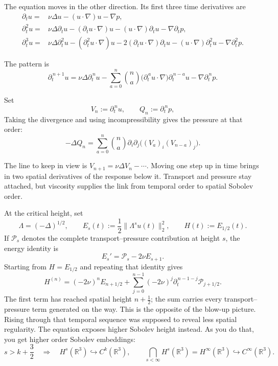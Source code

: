 The equation moves in the other direction. Its first three time derivatives
are
\[
\begin{aligned}
\partial_tu
={}&\nu\Delta u
 -(u\!\cdot\nabla)u
 -\nabla p,\\[3pt]
\partial_t^2u
={}&\nu\Delta\partial_tu
 -(\partial_tu\!\cdot\nabla)u
 -(u\!\cdot\nabla)\partial_tu
 -\nabla\partial_tp,\\[3pt]
\partial_t^3u
={}&\nu\Delta\partial_t^2u
 -(\partial_t^2u\!\cdot\nabla)u
 -2(\partial_tu\!\cdot\nabla)\partial_tu
 -(u\!\cdot\nabla)\partial_t^2u
 -\nabla\partial_t^2p.
\end{aligned}
\]
\begin{samepage}
The pattern is
\[
\partial_t^{\,n+1}u
=\nu\Delta\partial_t^{\,n}u
-\sum_{a=0}^{n}\binom na
  \bigl(\partial_t^{\,a}u\!\cdot\nabla\bigr)
  \partial_t^{\,n-a}u
-\nabla\partial_t^{\,n}p.
\]
\end{samepage}
\begin{samepage}
Set
\[
V_n:=\partial_t^{\,n}u,
\qquad
Q_n:=\partial_t^{\,n}p,
\]
Taking the divergence and using incompressibility gives the pressure at that
order:
\[
-\Delta Q_n
=\sum_{a=0}^{n}\binom na
  \partial_i\partial_j
  \bigl((V_a)_i(V_{n-a})_j\bigr).
\]
\end{samepage}
The line to keep in view is \(V_{n+1}=\nu\Delta V_n-\cdots\). Moving one step
up in time brings in two spatial derivatives of the response below it.
Transport and pressure stay attached, but viscosity supplies the link from
temporal order to spatial Sobolev order.

At the critical height, set
\[
\Lambda=(-\Delta)^{1/2},
\qquad
E_s(t):=\frac12\|\Lambda^su(t)\|_2^2,
\qquad
H(t):=E_{1/2}(t).
\]
If \(\mathcal P_s\) denotes the complete transport--pressure contribution at
height \(s\), the energy identity is
\[
E_s'=\mathcal P_s-2\nu E_{s+1}.
\]
Starting from \(H=E_{1/2}\) and repeating that identity gives
\[
H^{(n)}
=(-2\nu)^nE_{n+1/2}
 +\sum_{j=0}^{n-1}(-2\nu)^j
   \partial_t^{\,n-1-j}\mathcal P_{j+1/2}.
\]
The first term has reached spatial height \(n+\tfrac12\); the sum carries every
transport--pressure term generated on the way. This is the opposite of the
blow-up picture. Rising through that temporal sequence was supposed to reveal
less spatial regularity. The equation exposes higher Sobolev height instead. As
you do that, you get higher order Sobolev embeddings:
\[
s>k+\frac32
\quad\Longrightarrow\quad
H^s(\mathbb R^3)\hookrightarrow C^k(\mathbb R^3),
\qquad
\bigcap_{s<\infty}H^s(\mathbb R^3)
=H^\infty(\mathbb R^3)
\hookrightarrow C^\infty(\mathbb R^3).
\]

